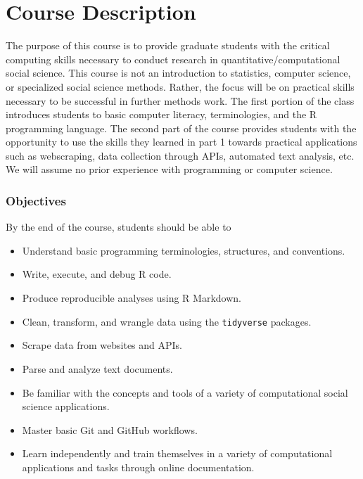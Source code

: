 \documentclass[]{book}
\providecommand{\tightlist}{%
  \setlength{\itemsep}{0pt}\setlength{\parskip}{0pt}}
\begin{document}
\section{Course Description}\label{course-description}

The purpose of this course is to provide graduate students with the
critical computing skills necessary to conduct research in
quantitative/computational social science. This course is not an
introduction to statistics, computer science, or specialized social
science methods. Rather, the focus will be on practical skills necessary
to be successful in further methods work. The first portion of the class
introduces students to basic computer literacy, terminologies, and the R
programming language. The second part of the course provides students
with the opportunity to use the skills they learned in part 1 towards
practical applications such as webscraping, data collection through
APIs, automated text analysis, etc. We will assume no prior experience
with programming or computer science.

\subsubsection*{Objectives}\label{objectives}

By the end of the course, students should be able to

\begin{itemize}
\tightlist
\item
  Understand basic programming terminologies, structures, and
  conventions.
\item
  Write, execute, and debug R code.
\item
  Produce reproducible analyses using R Markdown.
\item
  Clean, transform, and wrangle data using the \texttt{tidyverse}
  packages.
\item
  Scrape data from websites and APIs.
\item
  Parse and analyze text documents.
\item
  Be familiar with the concepts and tools of a variety of computational
  social science applications.
\item
  Master basic Git and GitHub workflows.
\item
  Learn independently and train themselves in a variety of computational
  applications and tasks through online documentation.
\end{itemize}
\end{document}
